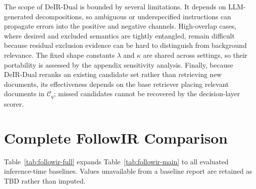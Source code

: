 \documentclass[letterpaper]{article}
\newcommand{\method}{DeIR-Dual}
\begin{document}
The scope of \method{} is bounded by several limitations.  It depends
on LLM-generated decompositions, so ambiguous or underspecified
instructions can propagate errors into the positive and negative
channels.  High-overlap cases, where desired and excluded semantics are
tightly entangled, remain difficult because residual exclusion evidence
can be hard to distinguish from background relevance.  The fixed shape
constants $\lambda$ and $\kappa$ are shared across settings, so their
portability is assessed by the appendix sensitivity analysis.
Finally, because \method{} reranks an existing candidate set rather than
retrieving new documents, its effectiveness depends on the base
retriever placing relevant documents in $\mathcal{C}_q$; missed
candidates cannot be recovered by the decision-layer scorer.

\appendix

\section{Complete FollowIR Comparison}
\label{app:followir-full}

Table~\ref{tab:followir-full} expands Table~\ref{tab:followir-main} to
all evaluated inference-time baselines.  Values unavailable from a
baseline report are retained as \textnormal{TBD} rather than imputed.
\end{document}
